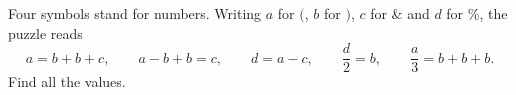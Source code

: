 Four symbols stand for numbers. Writing $a$ for $($, $b$ for $)$, $c$ for \& and $d$ for \%, the puzzle reads
\[a=b+b+c,\qquad a-b+b=c,\qquad d=a-c,\qquad \dfrac d2=b,\qquad \dfrac a3=b+b+b.\]
Find all the values.
